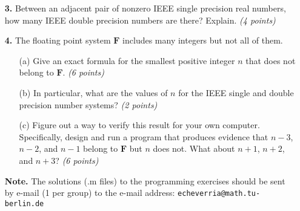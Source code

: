 \documentclass[10pt]{report}
\begin{document}
\begin{enumerate}
\item[\textbf{3.}] Between an adjacent pair of nonzero IEEE single precision real numbers, how many IEEE double precision numbers are there? Explain. \textit{(4 points)} 

\vspace{0.1cm} 

\item[\textbf{4.}] The floating point  system $\mathbf{F}$ includes many integers but not all of them.
  \begin{enumerate}
    \item[(a)] Give an exact formula for the smallest positive integer $n$ that does not belong to $\mathbf{F}$.  \textit{(6 points)} 
    \item[(b)] In particular, what are the values of $n$ for the IEEE single and double precision number systems?  \textit{(2 points)} 
    \item[(c)] Figure out a way to verify this result for your own computer. Specifically, design and run a program that produces evidence that $n-3$, $n-2$, and $n-1$ belong to $\mathbf{F}$ but $n$ does not. What about $n+1$, $n+2$, and $n+3$? \textit{(6 points)} 
    \end{enumerate}


\item[\textbf{Note.}] The solutions (.m files) to the programming exercises should be sent by e-mail (1 per group) to the e-mail address: \verb+echeverria@math.tu-berlin.de+ \\


\end{enumerate}
\end{document}
